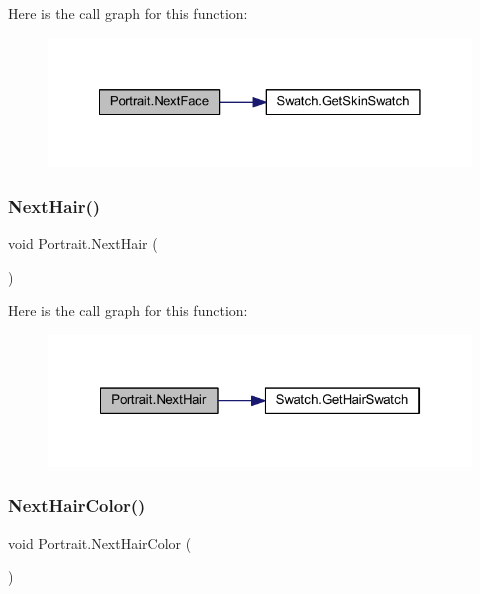 Here is the call graph for this function\+:\nopagebreak
\begin{figure}[H]
\begin{center}
\leavevmode
\includegraphics[width=328pt]{class_portrait_aaa0da57aae916077e97d6c9d0a48aa4d_cgraph}
\end{center}
\end{figure}
\mbox{\label{class_portrait_ae14081edd428a837484936bc56350a12}} 
\subsubsection{\texorpdfstring{NextHair()}{NextHair()}}
{\footnotesize\ttfamily void Portrait.\+Next\+Hair (\begin{DoxyParamCaption}{ }\end{DoxyParamCaption})}

Here is the call graph for this function\+:\nopagebreak
\begin{figure}[H]
\begin{center}
\leavevmode
\includegraphics[width=322pt]{class_portrait_ae14081edd428a837484936bc56350a12_cgraph}
\end{center}
\end{figure}
\mbox{\label{class_portrait_a8117eeefced674e0a4a483745ea0053d}} 
\subsubsection{\texorpdfstring{NextHairColor()}{NextHairColor()}}
{\footnotesize\ttfamily void Portrait.\+Next\+Hair\+Color (\begin{DoxyParamCaption}{ }\end{DoxyParamCaption})}


